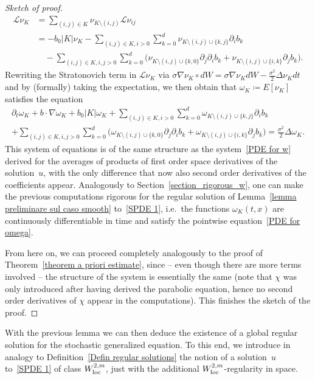 \documentclass[a4paper,10pt]{article}
\newcommand\1{\mathbbm{1}}
\newcommand\loc{{\rm loc}}
\numberwithin{equation}{section}
\begin{document}
\begin{proof}[Sketch of proof]
\begin{align*}
  \mathcal{L} \nu_K & = \sum_{(i,j) \in K} \nu_{K \setminus (i,j)} \mathcal{L} \nu_{ij} \\
  & = - b_0 |K| \nu_K - \sum_{(i,j) \in K, i>0} \sum_{k=0}^{d} \nu_{K \setminus (i,j) \cup \{k,j\} }\partial _i b_k \\
  & \quad {}- \sum_{(i,j) \in K, i,j>0} \sum_{k=0}^d \Big( \nu_{K \setminus (i,j) \cup \{k,0\} } \partial_{j} \partial_{i}b_k + \nu_{K \setminus (i,j) \cup \{i,k\} } \partial_j b_k \Big).
\end{align*}
Rewriting the Stratonovich term in $\mathcal{L} \nu_K$ via $\sigma \nabla \nu_{K}\circ dW=\sigma\nabla \nu_{K}dW-\frac{\sigma^{2}}{2}\Delta \nu_{K}dt$ and by (formally) taking the expectation, we then obtain that $\omega_K \coloneqq  E[\nu_K]$ satisfies the equation
\begin{multline}
\partial_{t} \omega_{K}+ b\cdot\nabla \omega_{K}+ b_0 |K| \omega_{K}
+ \sum_{(i,j) \in K, i>0} \sum_{k=0}^{d} \omega_{K \setminus (i,j) \cup \{k,j\} }\partial _i b_k \\
+ \sum_{(i,j) \in K, i,j>0} \sum_{k=0}^d \Big( \omega_{K \setminus (i,j) \cup \{k,0\} } \partial_{j} \partial_{i}b_k + \omega_{K \setminus (i,j) \cup \{i,k\} } \partial_j b_k \Big)
 = \frac{\sigma^{2}}{2} \Delta \omega_{K}. \label{PDE for omega}
\end{multline}
This system of equations is of the same structure as the system~\eqref{PDE for w} derived for the averages of products of first order space derivatives of the solution~$u$, with the only difference that now also second order derivatives of the coefficients appear. Analogously to Section~\ref{section_rigorous_w}, one can make the previous computations rigorous for the regular solution of Lemma~\ref{lemma preliminare sul caso smooth} to~\eqref{SPDE 1}, i.e.~the functions $\omega_K(t,x)$ are continuously differentiable in time and satisfy the pointwise equation~\eqref{PDE for omega}.

From here on, we can proceed completely analogously to the proof of Theorem~\ref{theorem a priori estimate}, since -- even though there are more terms involved -- the structure of the system is essentially the same (note that $\chi$ was only introduced after having derived the parabolic equation, hence no second order derivatives of $\chi$ appear in the computations). This finishes the sketch of the proof.
\end{proof}

With the previous lemma we can then deduce the existence of a global regular solution for the stochastic generalized equation. To this end, we introduce in analogy to Definition~\ref{Defin regular solutions} the notion of a solution~$u$ to~\eqref{SPDE 1} of class $W_{\loc}^{2,m}$, just with the additional $W_{\loc}^{2,m}$-regularity in space.
\end{document}
